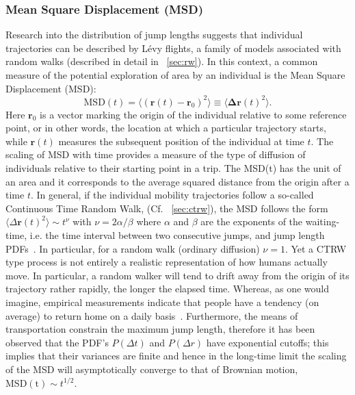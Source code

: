 \subsubsection{Mean Square Displacement (MSD)}\label{sec:msd}

Research into the distribution of jump lengths suggests that individual trajectories can be described by L\'evy flights, a family of models associated with random walks (described in detail in \sectionname~\ref{sec:rw}). In this context, a common measure of the potential exploration of area by an individual is the Mean Square Displacement (MSD):
\begin{equation}
\mathrm{MSD}(t) = \langle (\mathbf{r}(t) - \mathbf{r}_0)^2 \rangle \equiv \langle \mathbf{\Delta r}(t)^2 \rangle.
\end{equation}
Here $\mathbf{r}_0$ is a vector marking the origin of the individual relative to some reference point, or in other words, the location at which a particular trajectory starts, while $\mathbf{r}(t)$ measures the subsequent position of the individual at time $t$. 
The scaling of MSD with time provides a measure of the type of diffusion of individuals relative to their starting point in a trip.
The MSD(t) has the unit of an area and it corresponds to the average squared distance from the origin after a time $t$. 
In general, if the individual mobility trajectories follow a so-called Continuous Time Random Walk, (Cf. \sectionname~\ref{sec:ctrw}), the MSD follows the form $\langle \Delta \mathbf{r}(t)^2 \rangle \sim t^{\nu}$ with $\nu = 2 \alpha /\beta$ where $\alpha$ and $\beta$ are the exponents of the waiting-time, i.e. the time interval between two consecutive jumps, and jump length PDFs~\cite{brockmann_2006_scaling}. 
In particular, for a random walk (ordinary diffusion) $\nu = 1$.
Yet a CTRW type process is not entirely a realistic representation of how humans actually move. In particular, a random walker will tend to drift away from the origin of its trajectory rather rapidly, the longer the elapsed time. 
Whereas, as one would imagine, empirical measurements indicate that people have a tendency (on average) to return home on a daily basis~\cite{gonzalez_2008_understanding}. Furthermore, the means of transportation constrain the maximum jump length, therefore it has been observed that the PDF's $P(\Delta t)$ and $P(\Delta r)$ have exponential cutoffs; this implies that their variances are finite and hence in the long-time limit the scaling of the MSD will asymptotically converge to that of Brownian motion, $\mathrm{MSD(t)} \sim t^{1/2}$.

